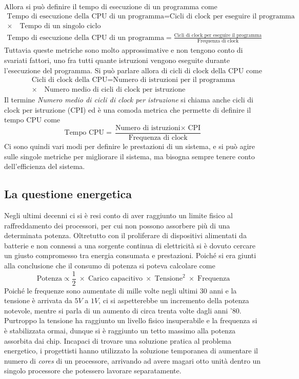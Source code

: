 \documentclass[a4paper,12pt]{article}
\theoremstyle{break}
\numberwithin{equation}{section}
\begin{document}
Allora si può definire il tempo di esecuzione di un programma come 
\begin{align*}
    \mbox{Tempo di esecuzione della CPU 
    di un programma} = \mbox{Cicli di clock per eseguire il programma}  \\
    \times \quad \mbox{Tempo di un singolo ciclo}
\end{align*}
\begin{gather*}
    \mbox{Tempo di esecuzione della CPU di un programma} = \frac{\mbox{Cicli di clock per eseguire il programma}}{\mbox{Frequenza di clock}}
\end{gather*}
Tuttavia queste metriche sono molto approssimative e non tengono conto di svariati fattori, uno fra tutti quante istruzioni vengono eseguite durante l'esecuzione del programma. Si può parlare allora di cicli di clock della CPU come 
\begin{align*}
    \mbox{Cicli di clock della CPU} = \mbox{Numero di istruzioni per il programma} \\ \times \quad \mbox{Numero medio di cicli di clock per istruzione}
\end{align*}
Il termine \textit{Numero medio di cicli di clock per istruzione} si chiama anche cicli di clock per istruzione (CPI) ed è una comoda metrica che permette di definire il tempo CPU come
\[
    \mbox{Tempo CPU} = \frac{\mbox{Numero di istruzioni} \times \; \mbox{CPI}}{\mbox{Frequenza di clock}}
\]
Ci sono quindi vari modi per definire le prestazioni di un sistema, e si può agire sulle singole metriche per migliorare il sistema, ma bisogna sempre tenere conto dell'efficienza del sistema.
\subsection{La questione energetica}
Negli ultimi decenni ci si è resi conto di aver raggiunto un limite fisico al raffreddamento dei processori, per cui non possono assorbere più di una determinata potenza. Oltretutto con il proliferare di dispositivi alimentati da batterie e non connessi a una sorgente continua di elettricità si è dovuto cercare un giusto compromesso tra energia consumata e prestazioni. 
Poiché si era giunti alla conclusione che il consumo di potenza si poteva calcolare come 
\[
    \mbox{Potenza} \propto \frac{1}{2} \; \times \; \mbox{Carico capacitivo} \; \times \; \mbox{Tensione}^2 \; \times \; \mbox{Frequenza}
\]
Poiché le frequenze sono aumentate di mille volte negli ultimi 30 anni e la tensione è arrivata da \(5V\) a \(1V\), ci si aspetterebbe un incremento della potenza notevole, mentre si parla di un aumento di circa trenta volte dagli anni '80. Purtroppo la tensione ha raggiunto un livello fisico insuperabile e la frequenza si è stabilizzata ormai, dunque si è raggiunto un tetto massimo alla potenza assorbita dai chip.
Incapaci di trovare una soluzione pratica al problema energetico, i progettisti hanno utilizzato la soluzione temporanea di aumentare il numero di \textit{cores} di un processore, arrivando ad avere magari otto unità dentro un singolo processore che potessero lavorare separatamente. 
\end{document}
